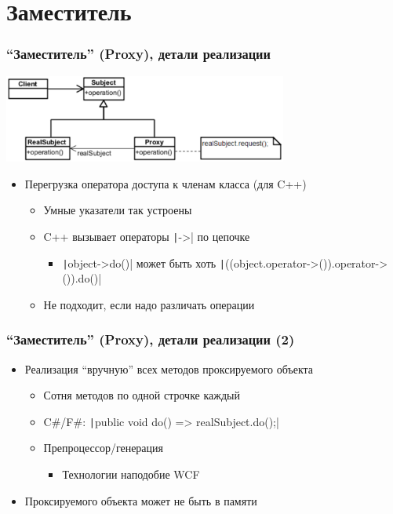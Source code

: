 \documentclass[xetex,mathserif,serif]{beamer}
\begin{document}
    \section{Заместитель}

    \begin{frame}
        \frametitle{``Заместитель'' (Proxy), детали реализации}
        \begin{center}
            \includegraphics[width=0.7\textwidth]{proxy.png}
        \end{center}
        \begin{itemize}
            \item Перегрузка оператора доступа к членам класса (для C++)
            \begin{itemize}
                \item Умные указатели так устроены
                \item C++ вызывает операторы \texttt|->| по цепочке
                \begin{itemize}
                    \item \texttt|object->do()| может быть хоть \texttt|((object.operator->()).operator->()).do()|
                \end{itemize}
                \item Не подходит, если надо различать операции
            \end{itemize}
        \end{itemize}
    \end{frame}

    \begin{frame}
        \frametitle{``Заместитель'' (Proxy), детали реализации (2)}
        \begin{itemize}
            \item Реализация ``вручную'' всех методов проксируемого объекта
            \begin{itemize}
                \item Сотня методов по одной строчке каждый
                \item C\#/F\#: \texttt|public void do() => realSubject.do();|
                \item Препроцессор/генерация
                \begin{itemize}
                    \item Технологии наподобие WCF
                \end{itemize}
            \end{itemize}
            \item Проксируемого объекта может не быть в памяти
        \end{itemize}
    \end{frame}
\end{document}
